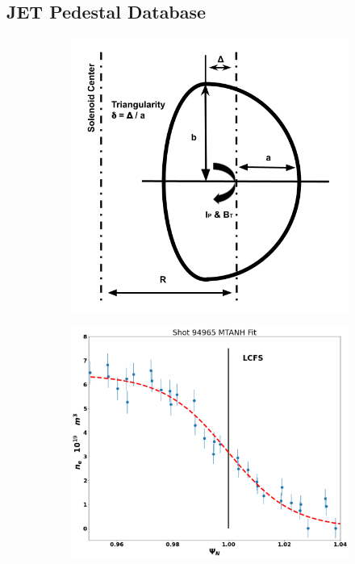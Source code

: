 \documentclass[a4paper, twoside, final, 12pt]{article}
\begin{document}
\subsection{JET Pedestal Database}
\begin{figure}
	\centering
	\begin{subfigure}{0.35\linewidth}
		\centering
		\includegraphics[scale=0.34]{./src/traingularity_crop_2}
		\caption{}
		\label{subfig:triangularity}
	\end{subfigure}\hfill
	\begin{subfigure}{0.60\linewidth}
		\centering
		\includegraphics[scale=0.22]{./src/MTANH_fit_21}

\end{subfigure}
\end{figure}
\end{document}
